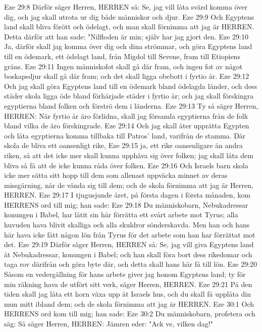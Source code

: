 Eze 29:8  Därför säger Herren, HERREN så: Se, jag vill låta svärd komma över dig, och jag skall utrota ur dig både människor och djur.
Eze 29:9  Och Egyptens land skall bliva förött och ödelagt, och man skall förnimma att jag är HERREN. Detta därför att han sade: "Nilfloden är min; själv har jag gjort den.
Eze 29:10  Ja, därför skall jag komma över dig och dina strömmar, och göra Egyptens land till en ödemark, ett ödelagt land, från Migdol till Sevene, fram till Etiopiens gräns.
Eze 29:11  Ingen människofot skall gå där fram, och ingen fot av något boskapsdjur skall gå där fram; och det skall ligga obebott i fyrtio år.
Eze 29:12  Och jag skall göra Egyptens land till en ödemark bland ödelagda länder, och dess städer skola ligga öde bland förhärjade städer i fyrtio år; och jag skall förskingra egyptierna bland folken och förströ dem i länderna.
Eze 29:13  Ty så säger Herren, HERREN: När fyrtio år äro förlidna, skall jag församla egyptierna från de folk bland vilka de äro förskingrade.
Eze 29:14  Och jag skall åter upprätta Egypten och låta egyptierna komma tillbaka till Patros' land, varifrån de stamma. Där skola de bliva ett oansenligt rike,
Eze 29:15  ja, ett rike oansenligare än andra riken, så att det icke mer skall kunna upphäva sig över folken; jag skall låta dem bliva så få att de icke kunna råda över folken.
Eze 29:16  Och Israels barn skola icke mer sätta sitt hopp till dem som allenast uppväcka minnet av deras missgärning, när de vända sig till dem; och de skola förnimma att jag är Herren, HERREN.
Eze 29:17  I tjugusjunde året, på första dagen i första månaden, kom HERRENS ord till mig; han sade:
Eze 29:18  Du människobarn, Nebukadressar konungen i Babel, har låtit sin här förrätta ett svårt arbete mot Tyrus; alla huvuden hava blivit skalliga och alla skuldror sönderskavda. Men han och hans här hava icke fått någon lön från Tyrus för det arbete som han har förrättat mot det.
Eze 29:19  Därför säger Herren, HERREN så: Se, jag vill giva Egyptens land åt Nebukadressar, konungen i Babel; och han skall föra bort dess rikedomar och taga rov därifrån och göra byte där, och detta skall hans här få till lön.
Eze 29:20  Såsom en vedergällning för hans arbete giver jag honom Egyptens land; ty för min räkning hava de utfört sitt verk, säger Herren, HERREN.
Eze 29:21  På den tiden skall jag låta ett horn växa upp åt Israels hus, och du skall få upplåta din mun mitt ibland dem; och de skola förnimma att jag är HERREN.
Eze 30:1  Och HERRENS ord kom till mig; han sade:
Eze 30:2  Du människobarn, profetera och säg: Så säger Herren, HERREN: Jämren eder: "Ack ve, vilken dag!"
